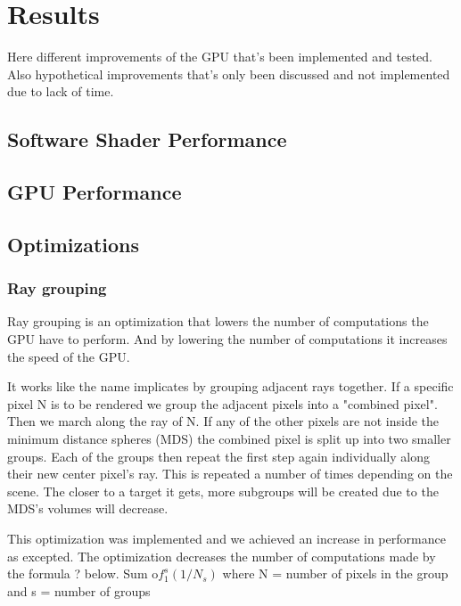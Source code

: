 \chapter{Results}

	Here different improvements of the GPU that's been implemented and tested.
	Also hypothetical improvements that's only been discussed and not
	implemented due to lack of time.  

	\section{Software Shader Performance}

	\section{GPU Performance}

	\section{Optimizations}

		\subsection{Ray grouping}
		
			Ray grouping is an optimization that lowers the number of
			computations the GPU have to perform. And by lowering the number of
			computations it increases the speed of the GPU.
			
			It works like the name implicates by grouping adjacent rays
			together.  If a specific pixel N is to be rendered we group the
			adjacent pixels into a "combined pixel". Then we march along the
			ray of N. If any of the other pixels are not inside the minimum
			distance spheres (MDS) the combined pixel is split up into two
			smaller groups. Each of the groups then repeat the first step again
			individually along their new center pixel's ray. This is repeated a
			number of times depending on the scene.  The closer to a target it
			gets, more subgroups will be created due to the MDS's volumes will
			decrease.
			
			This optimization was implemented and we achieved an increase in
			performance as excepted. The optimization decreases the number of
			computations made by the formula ? below.  Sum o$f_1^s(1/N_s)$
			where N = number of pixels in the group and s = number of groups
		
		
